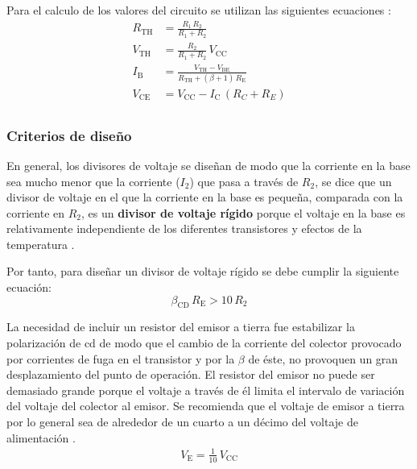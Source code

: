 Para el calculo de los valores del circuito se utilizan las siguientes
ecuaciones \cite{Boylestad}:
\begin{equation*}
    \begin{split}
        R_{\text{TH}} &= \frac{R_1\,R_2}{R_1+R_2}\\
        V_{\text{TH}} &= \frac{R_2}{R_1+R_2}\,V_{\text{CC}}\\
        I_{\text{B}}  &= \frac{V_{\text{TH}}-V_{\text{BE}}}
                         {R_{\text{TH}}+(\beta + 1)\,R_{\text{E}}}\\
        V_{\text{CE}} &= V_{\text{CC}} - I_{\text{C}}\,(R_C + R_E)\\
    \end{split}
\end{equation*}

\subsubsection{Criterios de diseño}
En general, los divisores de voltaje se diseñan de modo que la corriente en la
base sea mucho menor que la corriente ($I_{\text{2}}$) que pasa a través de
$R_{\text{2}}$, se dice que un divisor de voltaje en el que la corriente en la
base es pequeña, comparada con la corriente en $R_{\text{2}}$, es un
\textbf{divisor de voltaje rígido} porque el voltaje en la base es relativamente
independiente de los diferentes transistores y efectos de la temperatura
\cite{Floyd}.

Por tanto, para diseñar un divisor de voltaje rígido se debe cumplir la
siguiente ecuación:
\begin{equation*}
    \beta_{\text{CD}}\,R_{\text{E}} > 10\,R_{\text{2}}
\end{equation*}

La necesidad de incluir un resistor del emisor a tierra fue estabilizar la
polarización de cd de modo que el cambio de la corriente del colector provocado
por corrientes de fuga en el transistor y por la $\beta$ de éste, no provoquen
un gran desplazamiento del punto de operación. El resistor del emisor no puede
ser demasiado grande porque el voltaje a través de él limita el intervalo de
variación del voltaje del colector al emisor. Se recomienda que el voltaje de
emisor a tierra por lo general sea de alrededor de un cuarto a un décimo del
voltaje de alimentación \cite{Boylestad}.
\begin{equation*}
    \begin{split}
        V_{\text{E}} = \frac{1}{10}\,V_{\text{CC}}
    \end{split}
\end{equation*}

